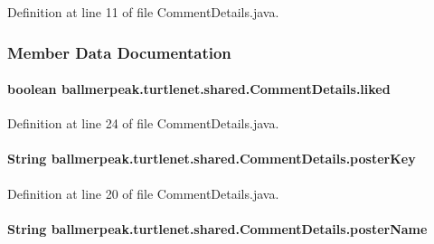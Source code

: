 Definition at line 11 of file Comment\-Details.\-java.



\subsubsection{Member Data Documentation}
\hypertarget{classballmerpeak_1_1turtlenet_1_1shared_1_1CommentDetails_a7aa48bc7182ff337eba405d2d7bb053f}{
\paragraph[{liked}]{\setlength{\rightskip}{0pt plus 5cm}boolean ballmerpeak.\-turtlenet.\-shared.\-Comment\-Details.\-liked}}\label{classballmerpeak_1_1turtlenet_1_1shared_1_1CommentDetails_a7aa48bc7182ff337eba405d2d7bb053f}


Definition at line 24 of file Comment\-Details.\-java.

\hypertarget{classballmerpeak_1_1turtlenet_1_1shared_1_1CommentDetails_a018d0738dd22703504c33b3bb6f8871a}{
\paragraph[{poster\-Key}]{\setlength{\rightskip}{0pt plus 5cm}String ballmerpeak.\-turtlenet.\-shared.\-Comment\-Details.\-poster\-Key}}\label{classballmerpeak_1_1turtlenet_1_1shared_1_1CommentDetails_a018d0738dd22703504c33b3bb6f8871a}


Definition at line 20 of file Comment\-Details.\-java.

\hypertarget{classballmerpeak_1_1turtlenet_1_1shared_1_1CommentDetails_a0feb9ab9c020b33ca5053ae2d6992b44}{
\paragraph[{poster\-Name}]{\setlength{\rightskip}{0pt plus 5cm}String ballmerpeak.\-turtlenet.\-shared.\-Comment\-Details.\-poster\-Name}}\label{classballmerpeak_1_1turtlenet_1_1shared_1_1CommentDetails_a0feb9ab9c020b33ca5053ae2d6992b44}


